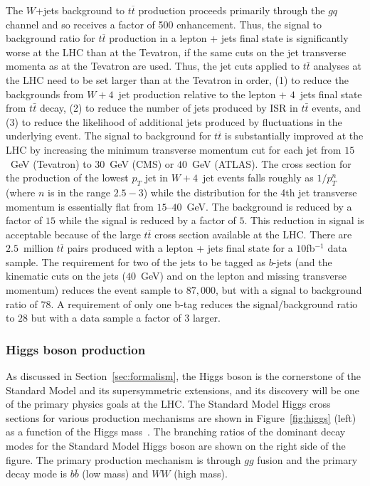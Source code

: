 \documentclass[12pt]{iopart}
\begin{document}
The $W$+jets background to $t\overline{t}$ production proceeds primarily through the $gq$ channel and so receives a factor of 500 enhancement. Thus, the signal to background ratio for $t\overline{t}$ production in a lepton + jets final state is significantly worse at the LHC than at the Tevatron, if the same cuts on the jet transverse momenta as at the Tevatron are used. 
Thus, the jet cuts
applied to $t\bar{t}$ analyses at the LHC need to be set larger than at the Tevatron in order, (1) to reduce
the backgrounds from $W + 4$~jet production relative to the lepton + $4$~jets final state from $t\bar{t}$ decay, (2) to reduce the number of jets produced by ISR in $t\bar{t}$ events, and (3) to reduce the likelihood of additional jets produced by fluctuations in the underlying event.
The signal to
background for $t\overline{t}$ is substantially improved at the LHC by increasing the minimum transverse momentum
cut for each jet from $15$~GeV (Tevatron) to $30$~GeV (CMS) or $40$~GeV (ATLAS). The cross section for the
production of the lowest $p_T$ jet in $W + 4$~jet events falls roughly as $1/p_T^n$ (where $n$ is in the range
$2.5-3$)
while the distribution for the 4th jet transverse momentum is essentially flat from $15$--$40$~GeV.
The background is
reduced by a factor of $15$ while the signal is reduced by a factor of $5$. This reduction in signal is acceptable because of the
large $t\overline{t}$ cross section available at the LHC. There are $2.5$~million $t\overline{t}$ pairs produced with
a lepton + jets final state for a $10$fb$^{-1}$ data sample. The requirement for two of the jets to be tagged as
$b$-jets (and the kinematic cuts on the jets ($40$~GeV) and on the lepton and missing transverse momentum) reduces the
event sample to $87,000$, but with a signal to background ratio of $78$. A requirement of only one b-tag reduces the
signal/background ratio to $28$ but with a data sample a factor of $3$ larger. 



\subsubsection{Higgs boson production}
\label{ref:higgs}

As discussed in Section~\ref{sec:formalism}, the Higgs boson is the cornerstone of the Standard Model and its supersymmetric extensions, and its discovery will be one of the primary physics goals at the LHC. The Standard Model Higgs cross sections for various production mechanisms are shown in Figure~\ref{fig:higgs} (left) as a function of the Higgs mass~\cite{CMS_tdr}. The branching ratios of the dominant decay modes for the Standard Model Higgs boson are shown on the right side of the figure. The primary production mechanism is through $gg$ fusion and the primary decay mode is $b\overline{b}$ (low mass) and $WW$ (high mass).  
\end{document}
